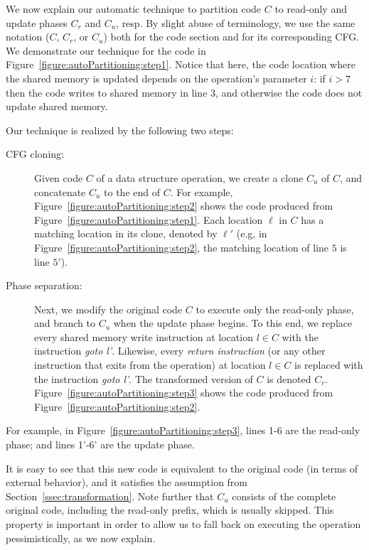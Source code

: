 We now explain our automatic technique to partition code $C$ to read-only and update phases $C_r$ and $C_u$, resp.
By slight abuse of terminology, we use the same notation ($C$, $C_r$, or $C_u$) both for the code section and 
for its corresponding CFG.  
%
We demonstrate our technique for the code in Figure~\ref{figure:autoPartitioning:step1}.
Notice that here, the code location where the shared memory is updated depends on the operation's parameter $i$: if $i>7$ then the code writes to shared memory in line $3$, and otherwise the code does not update shared memory.

\noindent Our technique is realized by the following two steps:
\begin{description}
  \item [CFG cloning:]
Given code $C$ of a data structure operation, we create a clone $C_u$ of $C$, and concatenate $C_u$ to the end of $C$.
For example, Figure~\ref{figure:autoPartitioning:step2} shows the code produced from Figure~\ref{figure:autoPartitioning:step1}.
Each location $\ell$ in $C$ has a matching location in its clone, denoted by $\ell'$
(e.g, in Figure~\ref{figure:autoPartitioning:step2}, the matching location of line $5$ is line $5'$).
  \item [Phase separation:]
Next, we modify the original code $C$ to execute only the read-only phase, and branch to $C_u$ when the 
update phase begins. To this end, we replace every shared memory write instruction 
at location $l \in C$ with the instruction \emph{goto l'}.
Likewise, every \emph{return instruction} (or any other instruction that exits from the operation) 
at location $l \in C$ is replaced with the instruction \emph{goto l'}.
The transformed version of $C$ is denoted $C_r$. 
Figure~\ref{figure:autoPartitioning:step3} shows the code produced from Figure~\ref{figure:autoPartitioning:step2}.
\end{description}


For example, in Figure~\ref{figure:autoPartitioning:step3}, lines 1-6 are the read-only phase; and lines 1'-6' are the update phase.

It is easy to see that this new code is equivalent to the original code (in terms of external behavior), and it satisfies the assumption from Section~\ref{ssec:transformation}. Note further that $C_u$ consists of the complete original code, including  
the read-only prefix, which is usually skipped. This property is important in order to allow us to fall back on executing the 
operation pessimistically, as we now explain. 

